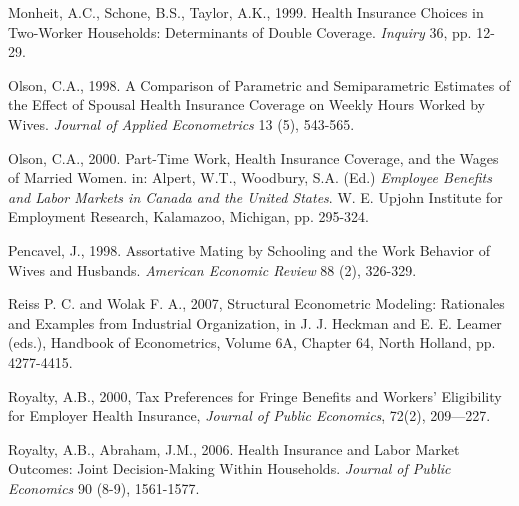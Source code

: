 \documentclass[legno,11pt]{article}
\begin{document}
\begin{thebibliography}{12}

 Monheit, A.C., Schone, B.S., Taylor, A.K., 1999. Health Insurance Choices in Two-Worker Households:
                  Determinants of Double Coverage. \emph{Inquiry} 36, pp. 12-29.


 Olson, C.A., 1998.
         A Comparison of Parametric and Semiparametric Estimates of the Effect of Spousal Health Insurance Coverage on
         Weekly Hours Worked by Wives.
             \emph{Journal of Applied Econometrics} 13 (5), 543-565.

 Olson, C.A., 2000.
                  Part-Time Work, Health Insurance Coverage, and the Wages of Married Women.
                 in: Alpert, W.T., Woodbury, S.A. (Ed.) \emph{Employee Benefits and Labor Markets in Canada and the United States}.
                 W. E. Upjohn Institute for Employment Research, Kalamazoo, Michigan, pp. 295-324.

 Pencavel, J., 1998.
                 Assortative Mating by Schooling and the Work Behavior of Wives and Husbands.
                 \emph{American Economic Review} 88 (2), 326-329.


 Reiss P. C. and Wolak F. A., 2007, Structural Econometric Modeling: Rationales and
Examples from Industrial Organization, in J. J. Heckman and E. E. Leamer (eds.),
Handbook of Econometrics, Volume 6A, Chapter 64, North Holland, pp. 4277-4415.

 Royalty, A.B., 2000, Tax Preferences for Fringe Benefits and Workers' Eligibility for
 Employer Health Insurance, \textit{Journal of Public Economics}, 72(2), 209—227.


 Royalty, A.B., Abraham, J.M., 2006.
                  Health Insurance and Labor Market Outcomes: Joint Decision-Making Within Households.
                  \emph{Journal of Public Economics} 90 (8-9), 1561-1577.


\end{thebibliography}
\end{document}
